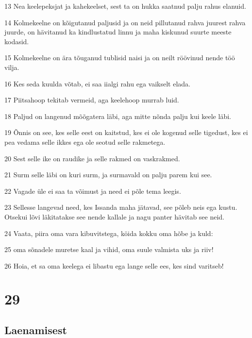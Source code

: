 \par 13 Nea keelepeksjat ja kahekeelset, sest ta on hukka saatnud palju rahus elanuid.
\par 14 Kolmekeelne on kõigutanud paljusid ja on neid pillutanud rahva juurest rahva juurde, on hävitanud ka kindlustatud linnu ja maha kiskunud suurte meeste kodasid.
\par 15 Kolmekeelne on ära tõuganud tublisid naisi ja on neilt röövinud nende töö vilja.
\par 16 Kes seda kuulda võtab, ei saa iialgi rahu ega vaikselt elada.
\par 17 Piitsahoop tekitab vermeid, aga keelehoop murrab luid.
\par 18 Paljud on langenud mõõgatera läbi, aga mitte nõnda palju kui keele läbi.
\par 19 Õnnis on see, kes selle eest on kaitstud, kes ei ole kogenud selle tigedust, kes ei pea vedama selle ikkes ega ole seotud selle rakmetega.
\par 20 Sest selle ike on raudike ja selle rakmed on vaskrakmed.
\par 21 Surm selle läbi on kuri surm, ja surmavald on palju parem kui see.
\par 22 Vagade üle ei saa ta võimust ja need ei põle tema leegis.
\par 23 Sellesse langevad need, kes Issanda maha jätavad, see põleb neis ega kustu. Otsekui lõvi läkitatakse see nende kallale ja nagu panter hävitab see neid.
\par 24 Vaata, piira oma vara kibuvitstega, köida kokku oma hõbe ja kuld:
\par 25 oma sõnadele muretse kaal ja vihid, oma suule valmista uks ja riiv!
\par 26 Hoia, et sa oma keelega ei libastu ega lange selle ees, kes sind varitseb!

\chapter{29}

\section*{Laenamisest}

